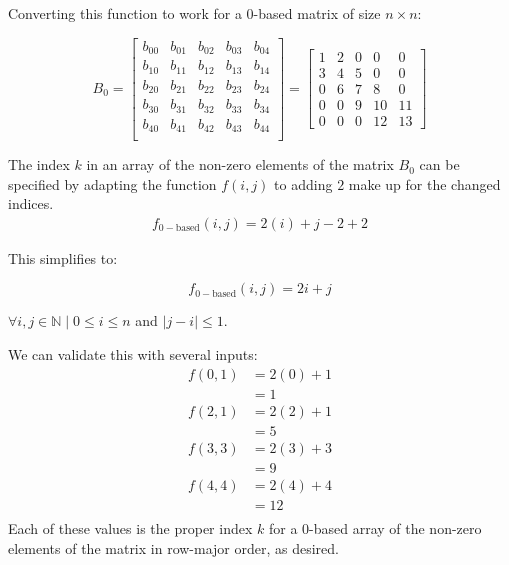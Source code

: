 \documentclass[12pt,letterpaper,final]{report}
\begin{document}
\begin{enumerate}
        Converting this function to work for a 0-based matrix of size $n \times n$:

        \[
          B_0 =
          \begin{bmatrix}
            b_{00} & \boxed{b_{01}} & b_{02} & b_{03}         & b_{04}         \\
            b_{10} & b_{11}         & b_{12} & b_{13}         & b_{14}         \\
            b_{20} & \boxed{b_{21}} & b_{22} & b_{23}         & b_{24}         \\
            b_{30} & b_{31}         & b_{32} & \boxed{b_{33}} & b_{34}         \\
            b_{40} & b_{41}         & b_{42} & b_{43}         & \boxed{b_{44}} \\
          \end{bmatrix}
          =
          \begin{bmatrix}
            1 & \boxed{2} & 0 & 0          & 0          \\
            3 & 4         & 5 & 0          & 0          \\
            0 & \boxed{6} & 7 & 8          & 0          \\
            0 & 0         & 9 & \boxed{10} & 11         \\
            0 & 0         & 0 & 12         & \boxed{13}
          \end{bmatrix}
        \]

        The index $k$ in an array of the non-zero elements of the matrix $B_0$ can be specified by adapting the function $f(i, j)$ to adding $2$ make up for the changed indices.
        \begin{align*}
          f_{0-\text{based}}(i,j) = 2(i) + j - 2 + 2
        \end{align*}

        This simplifies to:

        \begin{equation}
          f_{0-\text{based}}(i,j) = 2i + j
        \end{equation}

        $\forall i, j \in \mathbb{N} \mid 0 \le i \le n$ and $|j - i| \le 1$.

        We can validate this with several inputs:
        \begin{align*}
          f(0,1) & = 2(0) + 1 \\
                 & = 1        \\
          f(2,1) & = 2(2) + 1 \\
                 & = 5        \\
          f(3,3) & = 2(3) + 3 \\
                 & = 9        \\
          f(4,4) & = 2(4) + 4 \\
                 & = 12       \\
        \end{align*}
        Each of these values is the proper index $k$ for a 0-based array of the non-zero elements of the matrix in row-major order, as desired.

\end{enumerate}
\end{document}
